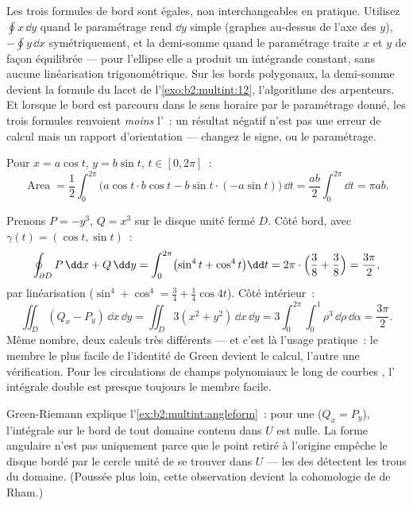 \begin{remark}
Les trois formules de bord sont égales, non interchangeables en
pratique. Utilisez $\oint x\,\dd y$ quand le paramétrage rend
$\dd y$ simple (graphes au-dessus de l'axe des $y$), $-\oint y\,\dd x$
symétriquement, et la demi-somme  quand le
paramétrage traite $x$ et $y$ de façon équilibrée --- pour l'ellipse
elle a produit un intégrande constant, sans aucune linéarisation
trigonométrique. Sur les bords polygonaux, la demi-somme
devient la formule du lacet de l'\cref{exo:b2:multint:12},
l'algorithme des arpenteurs. Et lorsque le bord est parcouru
dans le sens horaire par le paramétrage donné, les trois formules
renvoient \emph{moins} l'~: un résultat négatif n'est pas une
erreur de calcul mais un rapport d'orientation --- changez le
signe, ou le paramétrage.
\end{remark}

\begin{example}\label{ex:b2:multint:ellipsearea}
Pour $x = a\cos t$, $y = b\sin t$, $t \in [0, 2\pi]$~:
\[
\operatorname{Area}
= \frac12\int_0^{2\pi}\bigl(a\cos t \cdot b\cos t
- b\sin t\cdot(-a\sin t)\bigr)\,\dd t
= \frac{ab}{2}\int_0^{2\pi}\dd t = \pi ab .
\]
\end{example}

\begin{example}\label{ex:b2:multint:greencheck}
Prenons $P = -y^3$, $Q = x^3$ sur le disque unité fermé $D$.
Côté bord, avec $\gamma(t) = (\cos t, \sin t)$~:
\[
\oint_{\partial D}P\,\dd x + Q\,\dd y
= \int_0^{2\pi}\bigl(\sin^4 t + \cos^4 t\bigr)\dd t
= 2\pi\cdot\Bigl(\frac38 + \frac38\Bigr) = \frac{3\pi}2 ,
\]
par linéarisation ($\sin^4 + \cos^4 = \tfrac34 +
\tfrac14\cos4t$). Côté intérieur~:
\[
\iint_D(Q_x - P_y)\,\dd x\,\dd y
= \iint_D 3(x^2 + y^2)\,\dd x\,\dd y
= 3\int_0^{2\pi}\!\!\int_0^1\rho^3\,\dd\rho\,\dd\alpha
= \frac{3\pi}2 .
\]
Même nombre, deux calculs très différents --- et c'est là
l'usage pratique~: le membre le plus facile de l'identité de Green
devient le calcul, l'autre une vérification. Pour les
circulations de champs polynomiaux le long de courbes , l'%
intégrale double est presque toujours le membre facile.
\end{example}

\begin{remark}
Green-Riemann explique l'\cref{ex:b2:multint:angleform}~: pour une
 ($Q_x = P_y$), l'intégrale sur le bord de tout domaine
contenu dans $U$ est nulle. La forme angulaire n'est pas 
uniquement parce que le point retiré à l'origine empêche le disque
bordé par le cercle unité de se trouver dans $U$ --- les  des  détectent les trous du domaine.
(Poussée plus loin, cette observation devient la cohomologie de de
Rham.)
\end{remark}


